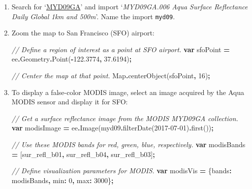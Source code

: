 \documentclass[
]{article}
\newenvironment{Shaded}{\begin{snugshade}}{\end{snugshade}}
\newcommand{\AttributeTok}[1]{\textcolor[rgb]{0.77,0.63,0.00}{#1}}
\newcommand{\BuiltInTok}[1]{#1}
\newcommand{\CommentTok}[1]{\textcolor[rgb]{0.56,0.35,0.01}{\textit{#1}}}
\newcommand{\DataTypeTok}[1]{\textcolor[rgb]{0.13,0.29,0.53}{#1}}
\newcommand{\DecValTok}[1]{\textcolor[rgb]{0.00,0.00,0.81}{#1}}
\newcommand{\FloatTok}[1]{\textcolor[rgb]{0.00,0.00,0.81}{#1}}
\newcommand{\FunctionTok}[1]{\textcolor[rgb]{0.00,0.00,0.00}{#1}}
\newcommand{\KeywordTok}[1]{\textcolor[rgb]{0.13,0.29,0.53}{\textbf{#1}}}
\newcommand{\NormalTok}[1]{#1}
\newcommand{\OperatorTok}[1]{\textcolor[rgb]{0.81,0.36,0.00}{\textbf{#1}}}
\newcommand{\StringTok}[1]{\textcolor[rgb]{0.31,0.60,0.02}{#1}}
\begin{document}
\begin{enumerate}
\def\labelenumi{\arabic{enumi}.}
\item
  Search for `\href{https://lpdaac.usgs.gov/dataset_discovery/modis/modis_products_table/myd09ga_v006}{MYD09GA}' and import `\emph{MYD09GA.006 Aqua Surface Reflectance Daily Global 1km and 500m}'. Name the import \texttt{myd09}.
\item
  Zoom the map to San Francisco (SFO) airport:

\begin{Shaded}
\begin{Highlighting}[]
\CommentTok{// Define a region of interest as a point at SFO airport.}
\KeywordTok{var}\NormalTok{ sfoPoint }\OperatorTok{=}\NormalTok{ ee}\OperatorTok{.}\AttributeTok{Geometry}\OperatorTok{.}\FunctionTok{Point}\NormalTok{(}\OperatorTok{{-}}\FloatTok{122.3774}\OperatorTok{,} \FloatTok{37.6194}\NormalTok{)}\OperatorTok{;}

\CommentTok{// Center the map at that point.}
\BuiltInTok{Map}\OperatorTok{.}\FunctionTok{centerObject}\NormalTok{(sfoPoint}\OperatorTok{,} \DecValTok{16}\NormalTok{)}\OperatorTok{;}
\end{Highlighting}
\end{Shaded}
\item
  To display a false-color MODIS image, select an image acquired by the Aqua MODIS sensor and display it for SFO:

\begin{Shaded}
\begin{Highlighting}[]
\CommentTok{// Get a surface reflectance image from the MODIS MYD09GA collection.}
\KeywordTok{var}\NormalTok{ modisImage }\OperatorTok{=}\NormalTok{ ee}\OperatorTok{.}\FunctionTok{Image}\NormalTok{(myd09}\OperatorTok{.}\FunctionTok{filterDate}\NormalTok{(}\StringTok{\textquotesingle{}2017{-}07{-}01\textquotesingle{}}\NormalTok{)}\OperatorTok{.}\FunctionTok{first}\NormalTok{())}\OperatorTok{;}

\CommentTok{// Use these MODIS bands for red, green, blue, respectively.}
\KeywordTok{var}\NormalTok{ modisBands }\OperatorTok{=}\NormalTok{ [}\StringTok{\textquotesingle{}sur\_refl\_b01\textquotesingle{}}\OperatorTok{,} \StringTok{\textquotesingle{}sur\_refl\_b04\textquotesingle{}}\OperatorTok{,} \StringTok{\textquotesingle{}sur\_refl\_b03\textquotesingle{}}\NormalTok{]}\OperatorTok{;}

\CommentTok{// Define visualization parameters for MODIS.}
\KeywordTok{var}\NormalTok{ modisVis }\OperatorTok{=}\NormalTok{ \{}\DataTypeTok{bands}\OperatorTok{:}\NormalTok{ modisBands}\OperatorTok{,} \DataTypeTok{min}\OperatorTok{:} \DecValTok{0}\OperatorTok{,} \DataTypeTok{max}\OperatorTok{:} \DecValTok{3000}\NormalTok{\}}\OperatorTok{;}


\end{Highlighting}
\end{Shaded}
\end{enumerate}
\end{document}
